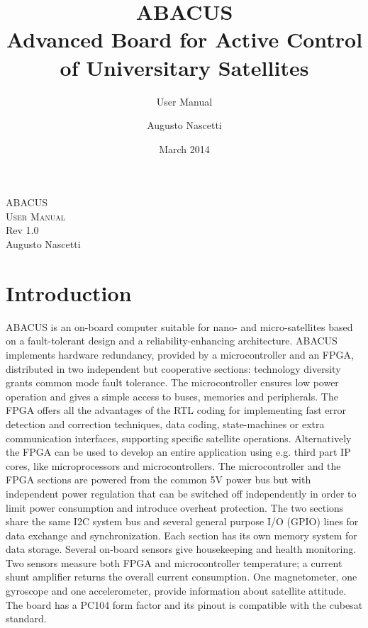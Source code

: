 \documentclass[12pt,a4paper]{report}
\author{Augusto Nascetti}
\title{\textbf{ABACUS}\\\textbf{A}dvanced \textbf{B}oard for \textbf{A}ctive \textbf{C}ontrol\\of \textbf{U}niversitary \textbf{S}atellites}
\subtitle{User Manual}
\date{March 2014}
\begin{document}
\maketitle

\begin{titlepage}
 \begin{center}
     \vspace{1em}
     {\Large \textsc{ABACUS}}\\
     \vspace{1em}
     {\Large \textsc{User Manual}}\\
     \vspace{2em}
     {\normalsize Rev 1.0}\\
     \vspace{1em}
     {\normalsize Augusto Nascetti}\\
     \vspace{1em}
 \end{center}
\end{titlepage}

\tableofcontents

\chapter{Introduction}
ABACUS is an on-board computer suitable for nano- and micro-satellites based on a fault-tolerant design and a reliability-enhancing architecture. ABACUS implements hardware redundancy, provided by a microcontroller and an FPGA, distributed in two independent but cooperative sections: technology diversity grants common mode fault tolerance. The microcontroller ensures low power operation and gives a simple access to buses, memories and peripherals. The FPGA offers all the advantages of the RTL coding for implementing fast error detection and correction techniques, data coding, state-machines or extra communication interfaces, supporting specific satellite operations. Alternatively the FPGA can be used to develop an entire application using e.g. third part IP cores, like microprocessors and microcontrollers. The microcontroller and the FPGA sections are powered from the common 5V power bus but with independent power regulation that can be switched off independently in order to limit power consumption and introduce overheat protection. The two sections share the same I2C system bus and several general purpose I/O (GPIO) lines for data exchange and synchronization. Each section has its own memory system for data storage. 
Several on-board sensors give housekeeping and health monitoring. Two sensors measure both FPGA and microcontroller temperature; a current shunt amplifier returns the overall current consumption. One magnetometer, one gyroscope and one accelerometer, provide information about satellite attitude.
The board has a PC104 form factor and its pinout is compatible with the cubesat standard.
\end{document}
